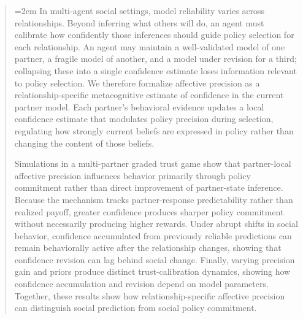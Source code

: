\begin{abstract}
\emergencystretch=2em
In multi-agent social settings, model reliability varies across relationships. Beyond inferring what others will do, an agent must calibrate how confidently those inferences should guide policy selection for each relationship. An agent may maintain a well-validated model of one partner, a fragile model of another, and a model under revision for a third; collapsing these into a single confidence estimate loses information relevant to policy selection. We therefore formalize affective precision as a relationship-specific metacognitive estimate of confidence in the current partner model. Each partner's behavioral evidence updates a local confidence estimate that modulates policy precision during selection, regulating how strongly current beliefs are expressed in policy rather than changing the content of those beliefs.

Simulations in a multi-partner graded trust game show that partner-local affective precision influences behavior primarily through policy commitment rather than direct improvement of partner-state inference. Because the mechanism tracks partner-response predictability rather than realized payoff, greater confidence produces sharper policy commitment without necessarily producing higher rewards. Under abrupt shifts in social behavior, confidence accumulated from previously reliable predictions can remain behaviorally active after the relationship changes, showing that confidence revision can lag behind social change. Finally, varying precision gain and priors produce distinct trust-calibration dynamics, showing how confidence accumulation and revision depend on model parameters. Together, these results show how relationship-specific affective precision can distinguish social prediction from social policy commitment.

\end{abstract}
